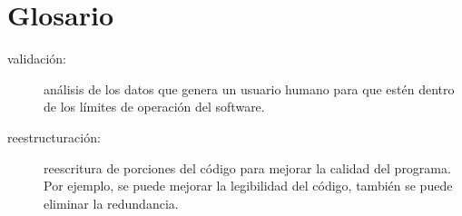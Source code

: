 \section{Glosario}

\begin{description}

\item[validación:] análisis de los datos que genera un usuario humano para que estén dentro
de los límites de operación del software.

\item[reestructuración:] reescritura de porciones del código para mejorar la calidad del programa. 
Por ejemplo, se puede mejorar la legibilidad del código, también se puede eliminar la redundancia.


\end{description}
